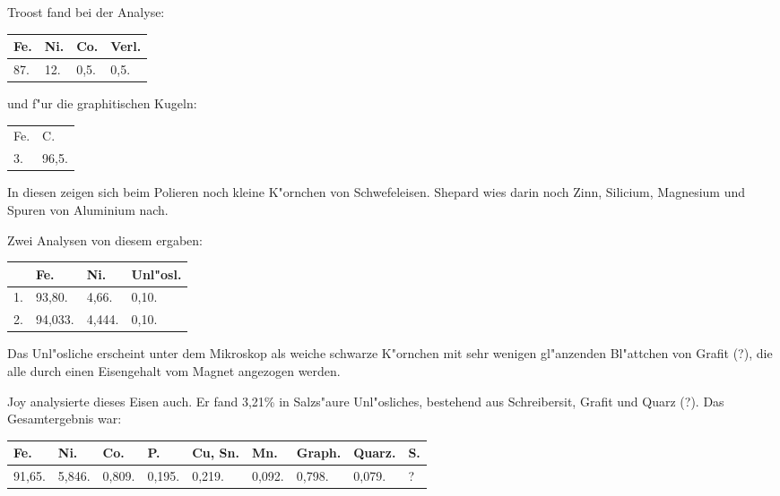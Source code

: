 \documentclass[a4paper, 11pt, oneside]{article}
\begin{document}
Troost fand bei der Analyse:
\begin{table}[H]
    \centering\swabfamily\Large
    \begin{tabular}{l l l l}
        Fe. & Ni. & Co. & Verl. \\ \hline
        87. & 12. & 0,5. & 0,5. \\
    \end{tabular}
\end{table}

und f"ur die graphitischen Kugeln:
\begin{table}[H]
    \centering\swabfamily\Large
    \begin{tabular}{l l}
        Fe. & C. \\
        3. & 96,5. \\
    \end{tabular}
\end{table}

In diesen zeigen sich beim Polieren noch kleine K"ornchen von Schwefeleisen. Shepard wies darin noch Zinn, Silicium, Magnesium und Spuren von Aluminium nach.

Zwei Analysen von diesem ergaben:
\begin{table}[H]
    \centering\swabfamily\Large
    \begin{tabular}{l l l l}
         & Fe. & Ni. & Unl"osl. \\ \hline
        1. & 93,80. & 4,66. & 0,10. \\
        2. & 94,033. & 4,444. & 0,10. \\
    \end{tabular}
\end{table}

Das Unl"osliche erscheint unter dem Mikroskop als weiche schwarze K"ornchen mit sehr wenigen gl"anzenden Bl"attchen von Grafit (?), die alle durch einen Eisengehalt vom Magnet angezogen werden.

Joy analysierte dieses Eisen auch. Er fand 3,21\% in Salzs"aure Unl"osliches, bestehend aus Schreibersit, Grafit und Quarz (?). Das Gesamtergebnis war:
\begin{table}[H]
    \centering\swabfamily\Large
    \begin{tabular}{l l l l l l l l l}
        Fe. & Ni. & Co. & P. & Cu, Sn. & Mn. & Graph. & Quarz. & S. \\ \hline
        91,65. & 5,846. & 0,809. & 0,195. & 0,219. & 0,092. & 0,798. & 0,079. & ? \\
    \end{tabular}
\end{table}
\end{document}
